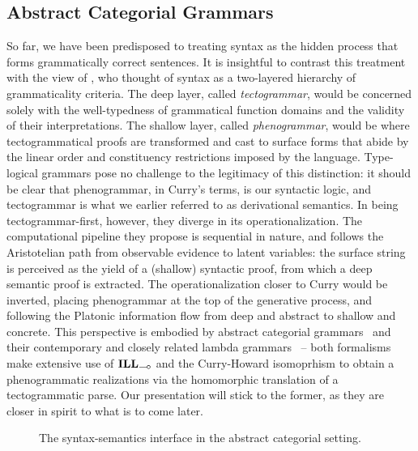 \subsection{Abstract Categorial Grammars}
\label{subsection:ACG}
So far, we have been predisposed to treating syntax as the hidden process that forms grammatically correct sentences.
It is insightful to contrast this treatment with the view of \citet{curry1961some}, who thought of syntax as a two-layered hierarchy of grammaticality criteria.
The deep layer, called \textit{tectogrammar}, would be concerned solely with the well-typedness of grammatical function domains and the validity of their interpretations.
The shallow layer, called \textit{phenogrammar}, would be where tectogrammatical proofs are transformed and cast to surface forms that abide by the linear order and constituency restrictions imposed by the language.
Type-logical grammars pose no challenge to the legitimacy of this distinction: it should be clear that phenogrammar, in Curry's terms, is our syntactic logic, and tectogrammar is what we earlier referred to as derivational semantics.
In being tectogrammar-first, however, they diverge in its operationalization.
The computational pipeline they propose is sequential in nature, and follows the Aristotelian path from observable evidence to latent variables: the surface string is perceived as the yield of a (shallow) syntactic proof, from which a deep semantic proof is extracted.
The operationalization closer to Curry would be inverted, placing phenogrammar at the top of the generative process, and following the Platonic information flow from deep and abstract to shallow and concrete.
This perspective is embodied by abstract categorial grammars~\cite{de2001towards} and their contemporary and closely related lambda grammars~\cite{muskens2001lambda} -- both formalisms make extensive use of $\ILL_{\li}$ and the Curry-Howard isomoprhism to obtain a phenogrammatic realizations via the homomorphic translation of a tectogrammatic parse.
Our presentation will stick to the former, as they are closer in spirit to what is to come later.

\begin{figure}
	\centering
	\caption{The syntax-semantics interface in the abstract categorial setting.}
	\label{figure:synsemacg}
\end{figure}

